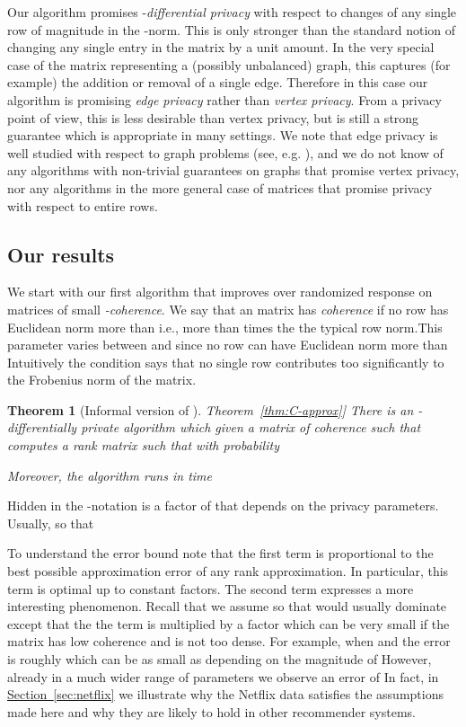 \documentclass[letterpaper,11pt]{article}
\newtheorem{theorem}{Theorem}[section]
\theoremstyle{definition}
\newcommand{\sectionref}[1]{\hyperref[sec:#1]{Section~\ref{sec:#1}}}
\newcommand{\theoremlabel}[1]{\label{thm:#1}}
\newcommand{\theoremref}[1]{\hyperref[thm:#1]{Theorem~\ref{thm:#1}}}
\begin{document}
Our algorithm promises -\emph{differential privacy}
\cite{DworkMNS06} with respect to changes of any single row of magnitude  in
the -norm.  This is only stronger than the standard notion of changing
any single entry in the matrix by a unit amount. In the very special case of
the matrix representing a (possibly unbalanced) graph, this captures (for
example) the addition or removal of a single edge. Therefore in this case our
algorithm is promising \emph{edge privacy} rather than \emph{vertex privacy}.
From a privacy point of view, this is less desirable than vertex privacy, but
is still a strong guarantee which is appropriate in many settings. We note
that edge privacy is well studied with respect to graph problems (see, e.g.
\cite{NissimRS07,GuptaLMRT10, GuptaRU11}), and we do not know of any
algorithms with non-trivial guarantees on graphs that promise vertex privacy,
nor any algorithms in the more general case of matrices that promise privacy
with respect to entire rows.

\subsection{Our results}

We start with our first algorithm that improves over randomized response on
matrices of small \emph{-coherence}. We say that an 
matrix  has \emph{coherence } if no row has Euclidean norm more than
 i.e., more than  times the the typical row
norm.This parameter varies between  and  since no row can have
Euclidean norm more than  Intuitively the condition says that no
single row contributes too significantly to the Frobenius norm of the matrix.

\begin{theorem}[Informal version of \theoremref{C-approx}]
\theoremlabel{informal1}
There is an -differentially private algorithm which given a
matrix  of coherence  such that 
computes a rank  matrix  such that with probability 

Moreover, the algorithm runs in time 
\end{theorem}
Hidden in the -notation is a factor of
 that depends on the privacy parameters.
Usually,  so that

To understand the error bound note that the first term is proportional to the
best possible approximation error  of any rank 
approximation. In particular, this term is optimal up to constant factors.
The second term expresses a more interesting phenomenon. Recall that we assume
 so that  would usually dominate  except that the
the  term is multiplied by a factor which can be very
small if the matrix has low coherence and is not too dense. For example, when
  and  the error is roughly
 which can be as small as  depending
on the magnitude of  However, already in a much wider range of parameters we
observe an error of  In fact, in \sectionref{netflix} we
illustrate why the Netflix data satisfies the assumptions made
here and why they are likely to hold in other recommender systems.
\end{document}
